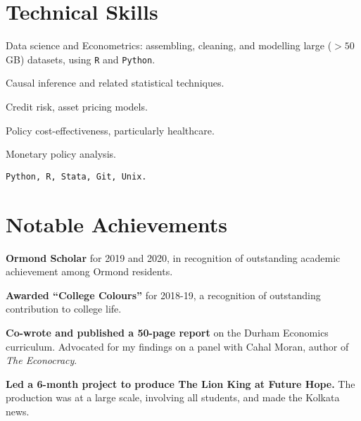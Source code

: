 \documentclass[a4]{article}
\renewenvironment{itemize}{
  \begin{list}{}{
    \setlength{\leftmargin}{1.5em}
  }
}{
  \end{list}
}
\begin{document}
\section*{Technical Skills}
\begin{itemize}
	\item Data science and Econometrics: assembling, cleaning, and modelling large (\(>50\)GB) datasets, using \texttt{R} and \texttt{Python}.
	\item Causal inference and related statistical techniques.
	\item Credit risk, asset pricing models. 
	\item Policy cost-effectiveness, particularly healthcare.
  \item Monetary policy analysis.
	\item \tt Python, R, Stata, Git, Unix.
\end{itemize}

\section*{Notable Achievements}
\begin{itemize}
\item \textbf{Ormond Scholar} for 2019 and 2020, in recognition of outstanding academic achievement among Ormond residents.
\item \textbf{Awarded ``College Colours''} for 2018-19, a recognition of outstanding contribution to college life.
\item \textbf{Co-wrote and published a 50-page report} on the Durham Economics curriculum. Advocated for my findings on a panel with Cahal Moran, author of \textit{The Econocracy}.
\item \textbf{Led a 6-month project to produce The Lion King at Future Hope.} The production was at a large scale, involving all students, and made the Kolkata news.
\end{itemize}

\end{document}
